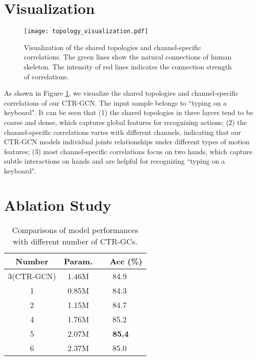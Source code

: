 \documentclass[10pt,twocolumn,letterpaper]{article}
\begin{document}
\section*{Visualization}
\begin{figure}[t]
	\centering
	\texttt{[image: topology\_visualization.pdf]} \caption{Visualization of the shared topologies and channel-specific correlations. The green lines show the natural connections of human skeleton. The intensity of red lines indicates the connection strength of correlations.}
	\label{fig:visualize}
\end{figure}

As shown in Figure \ref{fig:visualize}, we visualize the shared topologies and channel-specific correlations of our CTR-GCN. The input sample belongs to ``typing on a keyboard". It can be seen that (1) the shared topologies in three layers tend to be coarse and dense, which captures global features for recognizing actions; (2) the channel-specific correlations varies with different channels, indicating that our CTR-GCN models individual joints relationships under different types of motion features; (3) most channel-specific correlations focus on two hands, which capture subtle interactions on hands and are helpful for recognizing ``typing on a keyboard".

\section*{Ablation Study}
\begin{table}
	\begin{center}
		\begin{tabular}{c c l}
			\hline
			\textbf{Number} & \textbf{Param.} & \ \ \textbf{Acc (\%)} \\
			\hline\hline
			3(CTR-GCN) & 1.46M & \ \ \ 84.9 \\
			\hline
			1 & 0.85M & \ \ \ 84.3 \\
			2 & 1.15M & \ \ \ 84.7 \\
			4 & 1.76M & \ \ \ 85.2  \\
			5 & 2.07M & \ \ \ \textbf{85.4} \\
			6 & 2.37M & \ \ \ 85.0  \\
			\hline
		\end{tabular}
	\end{center}
	\caption{Comparisons of model performances with different number of CTR-GCs.}
	\label{tab:num_ctrgcs}
\end{table}
\end{document}
